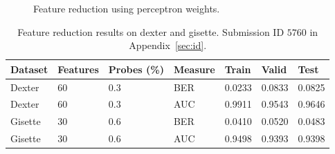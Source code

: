 \documentclass{ecsarticle}     %
\begin{document}
\begin{figure}[!htb]
	\centering
\caption{Feature reduction using perceptron weights.}
\label{fig:feat}
\end{figure}



\begin{table}[h]
	\centering
	\begin{tabular}{|l|l|l|l|l|l|l|} \hline
     	\textbf{Dataset} & \textbf{Features} & \textbf{Probes (\%)}	& \textbf{Measure}	& \textbf{Train} & \textbf{Valid} & \textbf{Test} \\ \hline
		Dexter &60 &0.3& BER & 0.0233 & 0.0833 & 0.0825 \\ \hline
		Dexter &60&0.3& AUC & 0.9911 & 0.9543 & 0.9646 \\ \hline
		Gisette &30&0.6& BER & 0.0410 & 0.0520 & 0.0483 \\ \hline
		Gisette &30&0.6& AUC & 0.9498 & 0.9393 & 0.9398 \\ \hline
	\end{tabular}
	\caption{Feature reduction results on dexter and gisette. Submission ID $5760$ in Appendix~\ref{sec:id}.}
	\label{tab:feat_test}
\end{table}
\end{document}
